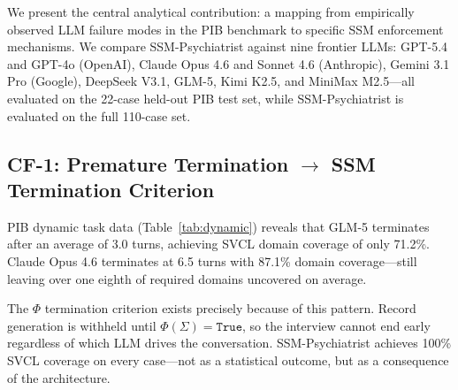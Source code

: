 \documentclass[conference]{IEEEtran}
\begin{document}
We present the central analytical contribution: a mapping from empirically observed LLM failure modes in the PIB benchmark to specific SSM enforcement mechanisms. We compare SSM-Psychiatrist against nine frontier LLMs: GPT-5.4 and GPT-4o (OpenAI), Claude Opus 4.6 and Sonnet 4.6 (Anthropic), Gemini 3.1 Pro (Google), DeepSeek V3.1, GLM-5, Kimi K2.5, and MiniMax M2.5---all evaluated on the 22-case held-out PIB test set, while SSM-Psychiatrist is evaluated on the full 110-case set.

\subsection{CF-1: Premature Termination $\rightarrow$ SSM Termination Criterion}

PIB dynamic task data (Table~\ref{tab:dynamic}) reveals that GLM-5 terminates after an average of 3.0 turns, achieving SVCL domain coverage of only 71.2\%. Claude Opus 4.6 terminates at 6.5 turns with 87.1\% domain coverage---still leaving over one eighth of required domains uncovered on average.

The $\Phi$ termination criterion exists precisely because of this pattern. Record generation is withheld until $\Phi(\Sigma) = \texttt{True}$, so the interview cannot end early regardless of which LLM drives the conversation. SSM-Psychiatrist achieves 100\% SVCL coverage on every case---not as a statistical outcome, but as a consequence of the architecture.
\end{document}
